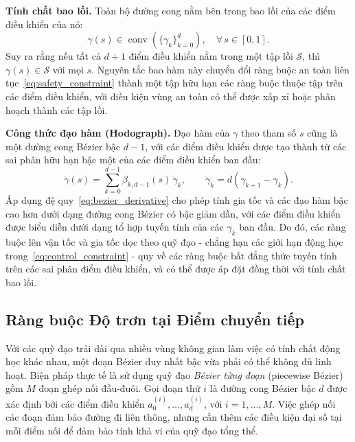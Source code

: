 \textbf{Tính chất bao lồi.}
Toàn bộ đường cong nằm bên trong bao lồi của các điểm điều khiển của nó:
\begin{equation}
    \gamma(s) \in \operatorname{conv}\!\left(\{\gamma_k\}_{k=0}^{d}\right),
    \quad \forall\, s \in [0,1].
    \label{eq:convex_hull}
\end{equation}
Suy ra rằng nếu tất cả $d+1$ điểm điều khiển nằm trong một tập lồi $\mathcal{S}$,
thì $\gamma(s) \in \mathcal{S}$ với mọi $s$.
Nguyên tắc bao hàm này chuyển đổi ràng buộc an toàn liên tục~\eqref{eq:safety_constraint}
thành một tập hữu hạn các ràng buộc thuộc tập trên các điểm điều khiển, với điều kiện vùng
an toàn có thể được xấp xỉ hoặc phân hoạch thành các tập lồi.

\textbf{Công thức đạo hàm (Hodograph).}
Đạo hàm của $\gamma$ theo tham số $s$ cũng là một đường cong Bézier bậc $d-1$,
với các điểm điều khiển được tạo thành từ các sai phân hữu hạn bậc một của các điểm
điều khiển ban đầu:
\begin{equation}
    \dot{\gamma}(s) = \sum_{k=0}^{d-1} \beta_{k,d-1}(s)\,\dot{\gamma}_k,
    \qquad \dot{\gamma}_k = d\!\left(\gamma_{k+1} - \gamma_k\right).
    \label{eq:bezier_derivative}
\end{equation}
Áp dụng đệ quy~\eqref{eq:bezier_derivative} cho phép tính gia tốc và các đạo hàm bậc cao
hơn dưới dạng đường cong Bézier có bậc giảm dần, với các điểm điều khiển được biểu diễn
dưới dạng tổ hợp tuyến tính của các $\gamma_k$ ban đầu.
Do đó, các ràng buộc lên vận tốc và gia tốc dọc theo quỹ đạo - chẳng hạn các giới hạn
động học trong~\eqref{eq:control_constraint} - quy về các ràng buộc bất đẳng thức tuyến
tính trên các sai phân điểm điều khiển, và có thể được áp đặt đồng thời với tính chất bao lồi.

\subsection{Ràng buộc Độ trơn tại Điểm chuyển tiếp}\label{subsec:continuity_constraints}

Với các quỹ đạo trải dài qua nhiều vùng không gian làm việc có tính chất động học khác nhau,
một đoạn Bézier duy nhất bậc vừa phải có thể không đủ linh hoạt.
Biện pháp thực tế là sử dụng quỹ đạo \emph{Bézier từng đoạn} (piecewise Bézier) gồm $M$
đoạn ghép nối đầu-đuôi.
Gọi đoạn thứ $i$ là đường cong Bézier bậc $d$ được xác định bởi các điểm điều khiển
$a^{(i)}_0, \ldots, a^{(i)}_d$, với $i = 1, \ldots, M$.
Việc ghép nối các đoạn đảm bảo đường đi liên thông, nhưng cần thêm các điều kiện đại số
tại mỗi điểm nối để đảm bảo tính khả vi của quỹ đạo tổng thể.


